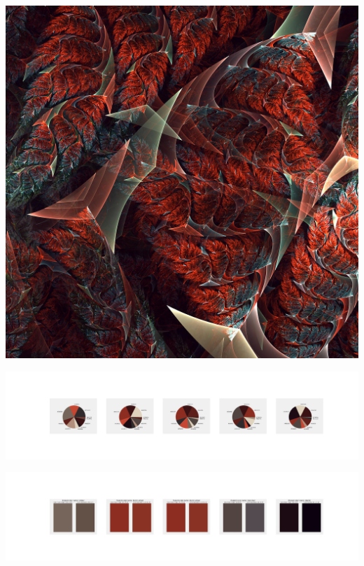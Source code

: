 \documentclass[11pt]{article}
\begin{document}
\begin{landscape}
    \begin{center}
    \includegraphics[width=\textwidth]{./nbimg/file (242).jpg}
    \end{center}

    \begin{center}
    \includegraphics[width=250mm]{./nbimg/pie-159.jpg}
    \end{center}

    \begin{center}
    \includegraphics[width=250mm]{./nbimg/peak-159.jpg}
    \end{center}
    


\end{landscape}
\end{document}
